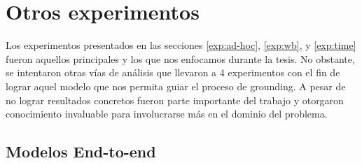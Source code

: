 % 
% 
% 
% 

\section{Otros experimentos}

Los experimentos presentados en las secciones \ref{exp:ad-hoc}, \ref{exp:wb}, y
\ref{exp:time} fueron aquellos principales y los que nos enfocamos durante la
tesis. No obstante, se intentaron otras vías de análisis que llevaron a 4
experimentos con el fin de lograr aquel modelo que nos permita guiar el proceso
de grounding. A pesar de no lograr resultados concretos fueron parte importante
del trabajo y otorgaron conocimiento invaluable para involucrarse más en el
dominio del problema.

\subsection{Modelos End-to-end}

